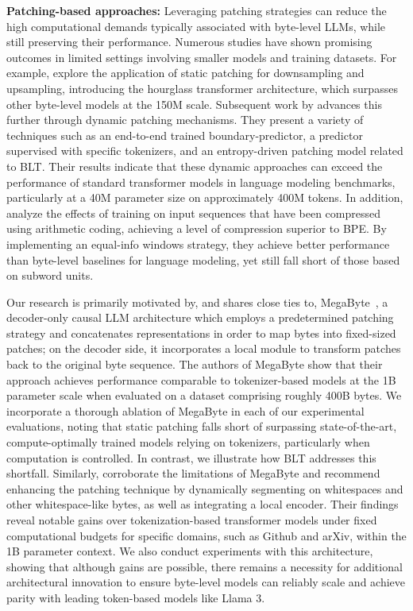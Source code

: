 \textbf{Patching-based approaches:} Leveraging patching strategies can reduce the high computational demands typically associated with byte-level LLMs, while still preserving their performance. Numerous studies have shown promising outcomes in limited settings involving smaller models and training datasets. For example, \cite{nawrot-etal-2022-hierarchical} explore the application of static patching for downsampling and upsampling, introducing the hourglass transformer architecture, which surpasses other byte-level models at the 150M scale. Subsequent work by \cite{nawrot-etal-2023-efficient} advances this further through dynamic patching mechanisms. They present a variety of techniques such as an end-to-end trained boundary-predictor, a predictor supervised with specific tokenizers, and an entropy-driven patching model related to {\textsc BLT}. Their results indicate that these dynamic approaches can exceed the performance of standard transformer models in language modeling benchmarks, particularly at a 40M parameter size on approximately 400M tokens. In addition, \cite{lester2024training} analyze the effects of training on input sequences that have been compressed using arithmetic coding, achieving a level of compression superior to BPE. By implementing an equal-info windows strategy, they achieve better performance than byte-level baselines for language modeling, yet still fall short of those based on subword units.

Our research is primarily motivated by, and shares close ties to, MegaByte~\citep{yu2023megabyte}, a decoder-only causal LLM architecture which employs a predetermined patching strategy and concatenates representations in order to map bytes into fixed-sized patches; on the decoder side, it incorporates a local module to transform patches back to the original byte sequence. The authors of MegaByte show that their approach achieves performance comparable to tokenizer-based models at the 1B parameter scale when evaluated on a dataset comprising roughly 400B bytes. We incorporate a thorough ablation of MegaByte in each of our experimental evaluations, noting that static patching falls short of surpassing state-of-the-art, compute-optimally trained models relying on tokenizers, particularly when computation is controlled. In contrast, we illustrate how {\textsc BLT} addresses this shortfall. Similarly, \cite{slagle2024spacebyte} corroborate the limitations of MegaByte and recommend enhancing the patching technique by dynamically segmenting on whitespaces and other whitespace-like bytes, as well as integrating a local encoder. Their findings reveal notable gains over tokenization-based transformer models under fixed computational budgets for specific domains, such as Github and arXiv, within the 1B parameter context. We also conduct experiments with this architecture, showing that although gains are possible, there remains a necessity for additional architectural innovation to ensure byte-level models can reliably scale and achieve parity with leading token-based models like Llama 3.

